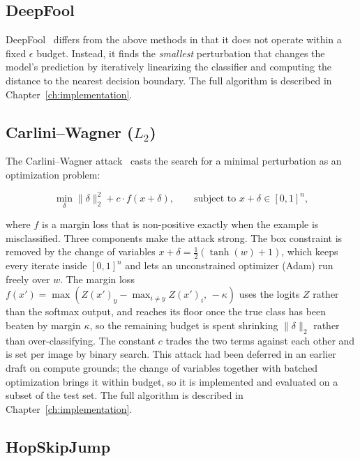 \subsection{DeepFool}

DeepFool~\cite{moosavidezfooli2016deepfool} differs from the above methods in that it does not operate within a fixed $\epsilon$ budget. Instead, it finds the \emph{smallest} perturbation that changes the model's prediction by iteratively linearizing the classifier and computing the distance to the nearest decision boundary. The full algorithm is described in Chapter~\ref{ch:implementation}.

\subsection{Carlini--Wagner ($L_2$)}

The Carlini--Wagner attack~\cite{carlini2017towards} casts the search for a minimal perturbation as an optimization problem:

\begin{equation}
    \min_\delta \|\delta\|_2^2 + c \cdot f(x + \delta), \qquad \text{subject to } x + \delta \in [0, 1]^n,
    \label{eq:cw_method}
\end{equation}

where $f$ is a margin loss that is non-positive exactly when the example is misclassified. Three components make the attack strong. The box constraint is removed by the change of variables $x + \delta = \tfrac{1}{2}(\tanh(w) + 1)$, which keeps every iterate inside $[0, 1]^n$ and lets an unconstrained optimizer (Adam) run freely over $w$. The margin loss $f(x') = \max(Z(x')_y - \max_{i \neq y} Z(x')_i,\, -\kappa)$ uses the logits $Z$ rather than the softmax output, and reaches its floor once the true class has been beaten by margin $\kappa$, so the remaining budget is spent shrinking $\|\delta\|_2$ rather than over-classifying. The constant $c$ trades the two terms against each other and is set per image by binary search. This attack had been deferred in an earlier draft on compute grounds; the change of variables together with batched optimization brings it within budget, so it is implemented and evaluated on a subset of the test set. The full algorithm is described in Chapter~\ref{ch:implementation}.

\subsection{HopSkipJump}

